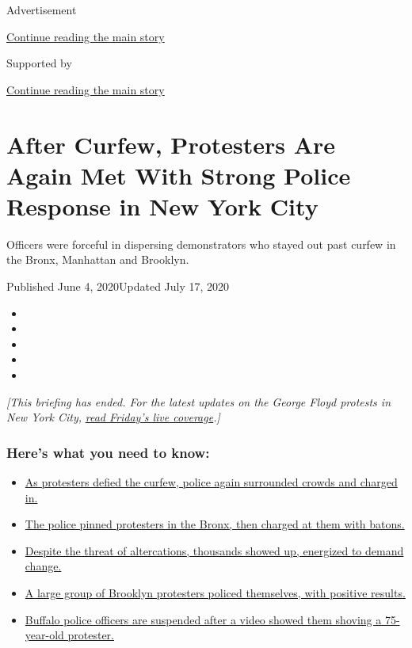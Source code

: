 Advertisement

\protect\hyperlink{after-top}{Continue reading the main story}

Supported by

\protect\hyperlink{after-sponsor}{Continue reading the main story}

\hypertarget{after-curfew-protesters-are-again-met-with-strong-police-response-in-new-york-city}{%
\section{After Curfew, Protesters Are Again Met With Strong Police
Response in New York
City}\label{after-curfew-protesters-are-again-met-with-strong-police-response-in-new-york-city}}

Officers were forceful in dispersing demonstrators who stayed out past
curfew in the Bronx, Manhattan and Brooklyn.

Published June 4, 2020Updated July 17, 2020

\begin{itemize}
\item
\item
\item
\item
\item
\end{itemize}

\emph{{[}This briefing has ended. For the latest updates on the George
Floyd protests in New York City,}
\href{https://www.nytimes3xbfgragh.onion/2020/06/05/nyregion/nyc-protests-george-floyd.html}{\emph{read
Friday's live coverage}}\emph{.{]}}

\hypertarget{heres-what-you-need-to-know}{%
\subsubsection{Here's what you need to
know:}\label{heres-what-you-need-to-know}}

\begin{itemize}
\tightlist
\item
  \protect\hyperlink{link-2c2fd029}{As protesters defied the curfew,
  police again surrounded crowds and charged in.}
\item
  \protect\hyperlink{link-5f1d02d0}{The police pinned protesters in the
  Bronx, then charged at them with batons.}
\item
  \protect\hyperlink{link-1a01dcc0}{Despite the threat of altercations,
  thousands showed up, energized to demand change.}
\item
  \protect\hyperlink{link-3835e093}{A large group of Brooklyn protesters
  policed themselves, with positive results.}
\item
  \protect\hyperlink{link-2b6fee88}{Buffalo police officers are
  suspended after a video showed them shoving a 75-year-old protester.}
\end{itemize}

